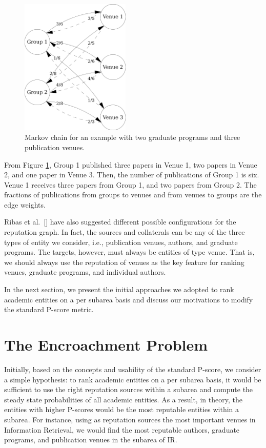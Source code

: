 \documentclass[msc]{ppgccufmg}
\begin{document}
\begin{figure}[h]
   \centerline{\includegraphics[width=5.2cm]{fig/bhrscore-w3}}
   \caption{Markov chain for an example with two graduate programs and three publication venues.}
   \label{fig:ex1-MC}
\end{figure}

From Figure \ref{fig:ex1-MC}, Group 1 published three papers in Venue 1, two papers in Venue 2, and one paper in Venue 3. Then, the number of publications of Group 1 is six. Venue 1 receives three papers from Group 1, and two papers from Group 2. The fractions of publications from groups to venues and from venues to groups are the edge weights.

Ribas et al.~[\citeyear{ribas17}] have also suggested different possible configurations for the reputation graph. In fact, the sources and collaterals can be any of the three types of entity we consider,  i.e., publication venues, authors, and graduate programs. The targets, however, must always be entities of type venue. That is, we should always use the reputation of venues as the key feature for ranking venues, graduate programs, and individual authors. 

In the next section, we present the initial approaches we adopted to rank academic entities on a per subarea basis and discuss our motivations to modify the standard P-score metric.


\section{The Encroachment Problem}\label{sec:encroachment}

Initially, based on the concepts and usability of the standard P-score, we consider a simple hypothesis: to rank academic entities on a per subarea basis, it would be sufficient to use the right reputation sources within a subarea and compute the steady state probabilities of all academic entities. As a result, in theory, the entities with higher P-scores would be the most reputable entities within a subarea. For instance, using as reputation sources the most important venues in Information Retrieval, we would find the most reputable authors, graduate programs, and publication venues in the subarea of IR.
\end{document}
